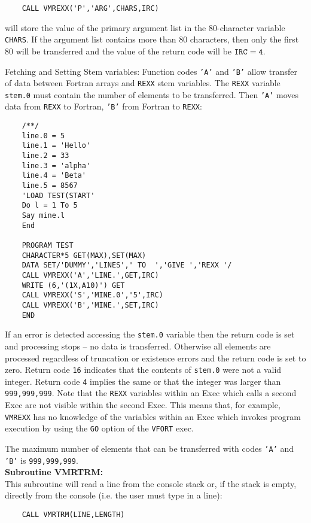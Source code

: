 \Examples
\begin{verbatim}
    CALL VMREXX('P','ARG',CHARS,IRC)
\end{verbatim}
will store the value of the primary argument list in
the 80-character variable {\tt CHARS}. If the argument list contains
more than 80 characters, then only the first 80 will be transferred and
the value of the return code will be $\mathtt{IRC = 4}$.
\par
Fetching and Setting Stem variables: Function codes {\tt 'A'} and
{\tt 'B'} allow transfer of data between Fortran arrays and
{\tt REXX} stem variables. The {\tt REXX} variable {\tt stem.0} must
contain the number of elements to be transferred. Then {\tt 'A'} moves
data from {\tt REXX} to Fortran, {\tt 'B'} from Fortran
to {\tt REXX}:
\newline
\begin{verbatim}
    /**/
    line.0 = 5
    line.1 = 'Hello'
    line.2 = 33
    line.3 = 'alpha'
    line.4 = 'Beta'
    line.5 = 8567
    'LOAD TEST(START'
    Do l = 1 To 5
    Say mine.l
    End
 
    PROGRAM TEST
    CHARACTER*5 GET(MAX),SET(MAX)
    DATA SET/'DUMMY','LINES',' TO  ','GIVE ','REXX '/
    CALL VMREXX('A','LINE.',GET,IRC)
    WRITE (6,'(1X,A10)') GET
    CALL VMREXX('S','MINE.0','5',IRC)
    CALL VMREXX('B','MINE.',SET,IRC)
    END
\end{verbatim}
If an error is detected accessing the {\tt stem.0} variable then the
return code is set and processing stops -- no data is transferred.
Otherwise all elements are processed regardless of truncation or
existence errors and the return code is set to zero.
Return code {\tt 16} indicates that the contents of {\tt stem.0}
were not a valid integer. Return code {\tt 4} implies the same or that
the integer was larger than {\tt 999,999,999}.
\Restrict
Note that the {\tt REXX} variables within an Exec which calls a
second Exec are not visible within the second Exec. This means
that, for example, {\tt VMREXX} has no knowledge of the variables within
an Exec which invokes program execution by using the {\tt GO} option
of the {\tt VFORT} exec.
\par
The maximum number of elements that can be transferred with
codes {\tt 'A'} and {\tt 'B'} is {\tt 999,999,999}. \\[3mm]
{\bf Subroutine VMRTRM:} \\[2mm]
This subroutine will read a line from the console stack or, if the
stack is empty, directly from the console (i.e. the user must type
in a line):
\begin{verbatim}
    CALL VMRTRM(LINE,LENGTH)
\end{verbatim}
